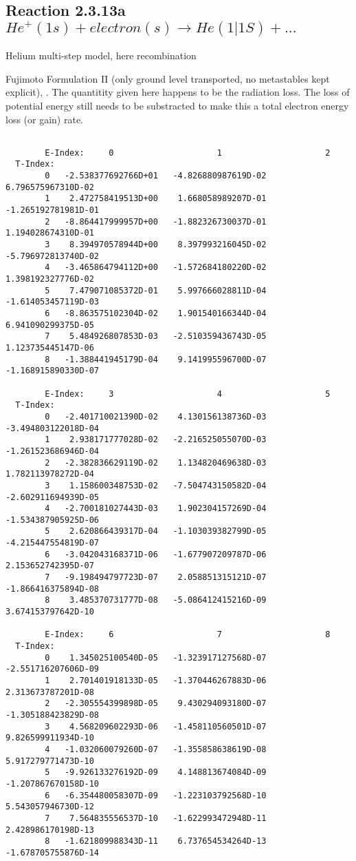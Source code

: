 \documentclass[12pt]{article}
\begin{document}
\subsection{
Reaction 2.3.13a $He^+(1s) + electron(s) \rightarrow   He(1|1S)+ ...$
}
Helium multi-step model, here recombination

 Fujimoto Formulation II (only ground level transported, no metastables
 kept explicit), \cite{kn:Fujimoto}.
 The quantitity given here happens to be the radiation loss.
 The loss of potential energy still needs to be substracted to make
 this a total electron energy loss (or gain) rate.



\begin{small}\begin{verbatim}

        E-Index:     0                     1                     2
  T-Index:
        0   -2.538377692766D+01   -4.826880987619D-02    6.796575967310D-02
        1    2.472758419513D+00    1.668058989207D-01   -1.265192781981D-01
        2   -8.864417999957D+00   -1.882326730037D-01    1.194028674310D-01
        3    8.394970578944D+00    8.397993216045D-02   -5.796972813740D-02
        4   -3.465864794112D+00   -1.572684180220D-02    1.398192327776D-02
        5    7.479071085372D-01    5.997666028811D-04   -1.614053457119D-03
        6   -8.863575102304D-02    1.901540166344D-04    6.941090299375D-05
        7    5.484926807853D-03   -2.510359436743D-05    1.123735445147D-06
        8   -1.388441945179D-04    9.141995596700D-07   -1.168915890330D-07

        E-Index:     3                     4                     5
  T-Index:
        0   -2.401710021390D-02    4.130156138736D-03   -3.494803122018D-04
        1    2.938171777028D-02   -2.216525055070D-03   -1.261523686946D-04
        2   -2.382836629119D-02    1.134820469638D-03    1.782113978272D-04
        3    1.158600348753D-02   -7.504743150582D-04   -2.602911694939D-05
        4   -2.700181027443D-03    1.902304157269D-04   -1.534387905925D-06
        5    2.620866439317D-04   -1.103039382799D-05   -4.215447554819D-07
        6   -3.042043168371D-06   -1.677907209787D-06    2.153652742395D-07
        7   -9.198494797723D-07    2.058851315121D-07   -1.866416375894D-08
        8    3.485370731777D-08   -5.086412415216D-09    3.674153797642D-10

        E-Index:     6                     7                     8
  T-Index:
        0    1.345025100540D-05   -1.323917127568D-07   -2.551716207606D-09
        1    2.701401918133D-05   -1.370446267883D-06    2.313673787201D-08
        2   -2.305554399898D-05    9.430294093180D-07   -1.305188423829D-08
        3    4.568209602293D-06   -1.458110560501D-07    9.826599911934D-10
        4   -1.032060079260D-07   -1.355858638619D-08    5.917279771473D-10
        5   -9.926133276192D-09    4.148813674084D-09   -1.207867670158D-10
        6   -6.354480058307D-09   -1.223103792568D-10    5.543057946730D-12
        7    7.564835556537D-10   -1.622993472948D-11    2.428986170198D-13
        8   -1.621809988343D-11    6.737654534264D-13   -1.678705755876D-14


\end{verbatim}
\end{small}
\end{document}
